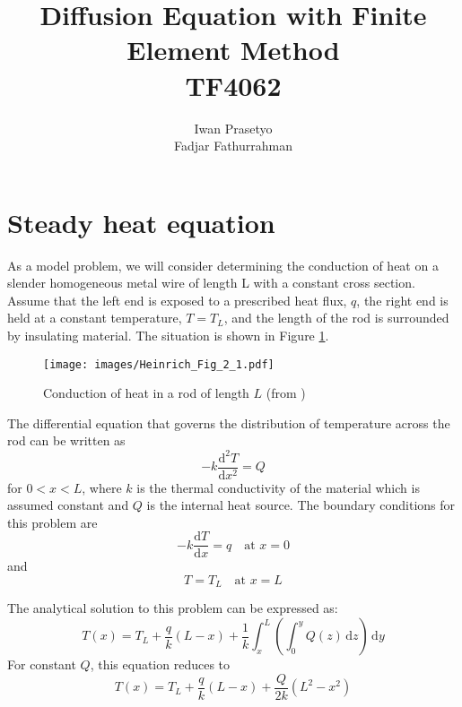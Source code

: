 \documentclass[a4paper,12pt]{article} %
\begin{document}
\title{Diffusion Equation with Finite Element Method \\
TF4062}
\author{Iwan Prasetyo \\
Fadjar Fathurrahman}
\date{}
\maketitle


\section{Steady heat equation}

As a model problem, we will consider determining the conduction of heat
on a slender homogeneous metal wire of length L with a constant cross
section. Assume that the left end is exposed to a prescribed heat flux, $q$,
the right end is held at a constant temperature, $T = T_L$, and the length of
the rod is surrounded by insulating material. The situation is shown in
Figure \ref{fig:Heinrich_Fig_2_1}.

\begin{figure}[H]
{\centering
\texttt{[image: images/Heinrich\_Fig\_2\_1.pdf]}
\par}
\caption{Conduction of heat in a rod of length $L$ (from \cite{Heinrich2017})}
\label{fig:Heinrich_Fig_2_1}
\end{figure}

The differential equation that
governs the distribution of temperature across the rod can be written as
\begin{equation}
-k \frac{\mathrm{d}^2 T}{\mathrm{d}x^2} = Q
\end{equation}
for $0 < x < L$, where $k$ is the thermal conductivity of the material
which is assumed constant and $Q$ is the internal heat source.
The boundary conditions for this problem are
\begin{equation}
-k\frac{\mathrm{d}T}{\mathrm{d}x} = q \quad \text{at } x = 0
\end{equation}
and
\begin{equation}
T = T_{L} \quad \text{at } x = L
\end{equation}

The analytical solution to this problem can be expressed as:
\begin{equation}
T(x) = T_{L} + \frac{q}{k}(L - x) + \frac{1}{k} \int_{x}^{L}
\left( \int_{0}^{y} Q(z)\,\mathrm{d}z \right)\,\mathrm{d}y
\end{equation}
%
For constant $Q$, this equation reduces to
\begin{equation}
T(x) = T_{L} + \frac{q}{k}(L - x) + \frac{Q}{2k}(L^2 - x^2)
\end{equation}
\end{document}
